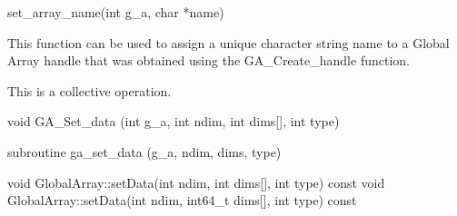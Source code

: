 \documentclass[12pt]{article}
\begin{document}
\begin{pyapi}
\begin{pycode}
set_array_name(int g_a, char *name)
\end{pycode}
\end{pyapi}
\gcoll

\begin{desc}

  This function can be used to assign a unique character string name
  to a Global Array handle that was obtained using the
  GA_Create_handle function.

  This is a collective operation.

\end{desc}



\begin{capi}
\begin{ccode}
void GA_Set_data (int g_a, int ndim, int dims[], int type)
\end{ccode}
\begin{funcargs}
\end{funcargs}
\end{capi}

\begin{fapi}
\begin{fcode}
subroutine ga_set_data (g_a, ndim, dims, type)
\end{fcode}
\begin{funcargs}
\end{funcargs}
\end{fapi}

\begin{cxxapi}
\begin{cxxcode}
void GlobalArray::setData(int ndim, int dims[], int type) const
void GlobalArray::setData(int ndim, int64_t dims[], int type) const
\end{cxxcode}
\begin{funcargs}
\end{funcargs}
\end{cxxapi}
\end{document}
